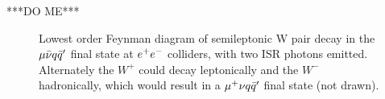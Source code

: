 ***DO ME***
\begin{figure}
  \centering
  
  
  \caption{Lowest order Feynman diagram of semileptonic W pair decay in the $\mu\bar{\nu} q\bar{q}'$ final state at $e^{+}e^{-}$ colliders, with two ISR photons emitted. Alternately the ${W}^{+}$ could decay leptonically and the ${W}^{-}$ hadronically, which would result in a $\mu^{+}\nu q\bar{q}'$ final state (not drawn).}
  \label{FEY:SemileptonicDecays}
\end{figure}
